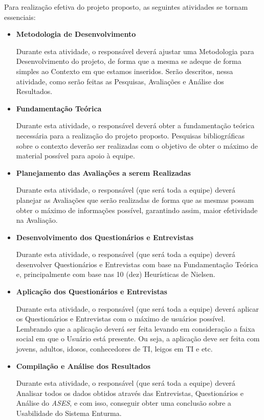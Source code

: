 
	Para realização efetiva do projeto proposto, as seguintes atividades se tornam essenciais:

	\begin{itemize}	
		\item \textbf{Metodologia de Desenvolvimento}

			Durante esta atividade, o responsável deverá ajustar uma Metodologia para Desenvolvimento do projeto, de forma que a mesma se adeque de forma simples ao Contexto em que estamos inseridos. Serão descritos, nessa atividade, como serão feitas as Pesquisas, Avaliações e Análise dos Resultados.

		\item \textbf{Fundamentação Teórica}

			Durante esta atividade, o responsável deverá obter a fundamentação teórica necessária para a realização do projeto proposto. Pesquisas bibliográficas sobre o contexto deverão ser realizadas com o objetivo de obter o máximo de material possível para apoio à equipe.

		\item \textbf{Planejamento das Avaliações a serem Realizadas}

			Durante esta atividade, o responsável (que será toda a equipe) deverá planejar as Avaliações que serão realizadas de forma que as mesmas possam obter o máximo de informações possível, garantindo assim, maior efetividade na Avaliação.

		\item \textbf{Desenvolvimento dos Questionários e Entrevistas}

			Durante esta atividade, o responsável (que será toda a equipe) deverá desenvolver Questionários e Entrevistas com base na Fundamentação Teórica e, principalmente com base nas 10 (dez) Heurísticas de Nielsen.

		\item \textbf{Aplicação dos Questionários e Entrevistas}

			Durante esta atividade, o responsável (que será toda a equipe) deverá aplicar os Questionários e Entrevistas com o máximo de usuários possível. Lembrando que a aplicação deverá ser feita levando em consideração a faixa social em que o Usuário está presente. Ou seja, a aplicação deve ser feita com jovens, adultos, idosos, conhecedores de TI, leigos em TI e etc.

		\item \textbf{Compilação e Análise dos Resultados}

			Durante esta atividade, o responsável (que será toda a equipe) deverá Analisar todos os dados obtidos através das Entrevistas, Questionários e Análise do \textit{ASES}, e com isso, conseguir obter uma conclusão sobre a Usabilidade do Sistema Enturma.


\end{itemize}
